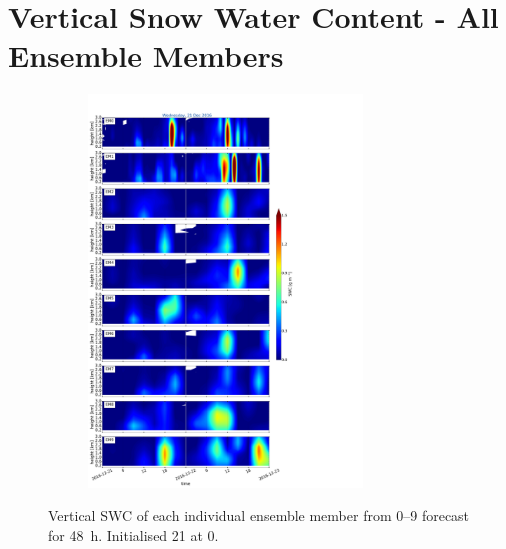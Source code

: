 
\section{Vertical Snow Water Content - All Ensemble Members}%
\label{app:vert_ensmemb09}

\begin{figure}[h]%
	\centering
	\begin{subfigure}[t]{\textwidth} 
		\centering
		\includegraphics[trim={0cm 0cm 18.3cm 5.1cm},clip,width=0.8\textwidth]{./fig_09EM/20161221}
		\caption{}\label{fig:EM09_21}
	\end{subfigure}
    \caption{Vertical SWC of each individual ensemble member from \numrange{0}{9} forecast for \SI{48}{\hour}. Initialised \SI{21}{\dec} at \SI{0}{\UTC}.}\label{fig:EM09}
\end{figure}
